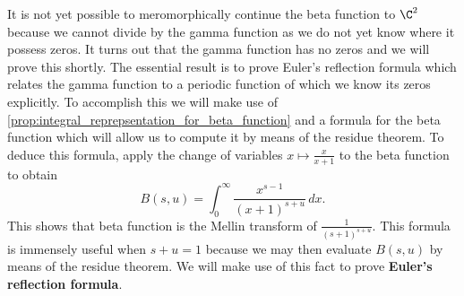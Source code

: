   It is not yet possible to meromorphically continue the beta function to \(\C^{2}\) because we cannot divide by the gamma function as we do not yet know where it possess zeros. It turns out that the gamma function has no zeros and we will prove this shortly. The essential result is to prove Euler's reflection formula which relates the gamma function to a periodic function of which we know its zeros explicitly. To accomplish this we will make use of \cref{prop:integral_reprepsentation_for_beta_function} and a formula for the beta function which will allow us to compute it by means of the residue theorem. To deduce this formula, apply the change of variables \(x \mapsto \frac{x}{x+1}\) to the beta function to obtain
  \begin{equation}\label{equ:residue_form_beta_function}
    B(s,u) = \int_{0}^{\infty}\frac{x^{s-1}}{(x+1)^{s+u}}\,dx.
  \end{equation}
  This shows that beta function is the Mellin transform of \(\frac{1}{(s+1)^{s+u}}\). This formula is immensely useful when \(s+u = 1\) because we may then evaluate \(B(s,u)\) by means of the residue theorem. We will make use of this fact to prove \textbf{Euler's reflection formula}.

